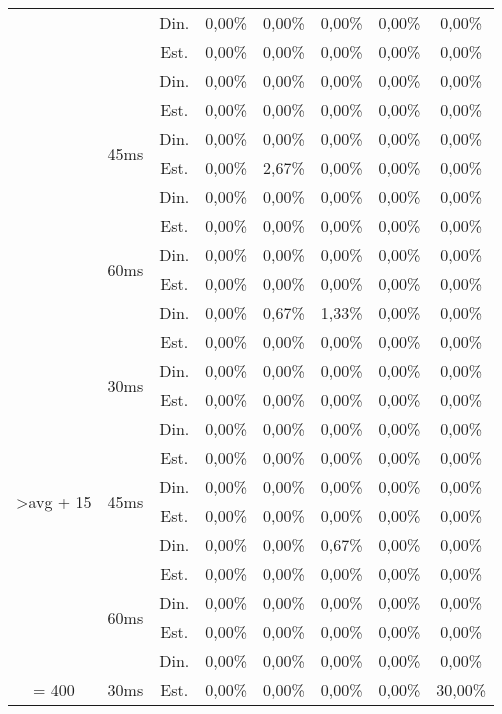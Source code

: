 \begin{center}
\begin{longtable}{|c|c|c|ccccc|}
 &  & Din. & 0,00\% & 0,00\% & 0,00\% & 0,00\% & 0,00\% \\
 &  & Est. & 0,00\% & 0,00\% & 0,00\% & 0,00\% & 0,00\% \\
 &  & Din. & 0,00\% & 0,00\% & 0,00\% & 0,00\% & 0,00\% \\ \cline{2-8} 
 & \multirow{4}{*}{45ms} & Est. & 0,00\% & 0,00\% & 0,00\% & 0,00\% & 0,00\% \\
 &  & Din. & 0,00\% & 0,00\% & 0,00\% & 0,00\% & 0,00\% \\
 &  & Est. & 0,00\% & 2,67\% & 0,00\% & 0,00\% & 0,00\% \\
 &  & Din. & 0,00\% & 0,00\% & 0,00\% & 0,00\% & 0,00\% \\ \cline{2-8} 
 & \multirow{4}{*}{60ms} & Est. & 0,00\% & 0,00\% & 0,00\% & 0,00\% & 0,00\% \\
 &  & Din. & 0,00\% & 0,00\% & 0,00\% & 0,00\% & 0,00\% \\
 &  & Est. & 0,00\% & 0,00\% & 0,00\% & 0,00\% & 0,00\% \\
 &  & Din. & 0,00\% & 0,67\% & 1,33\% & 0,00\% & 0,00\% \\ \hline
\multirow{12}{*}{\textgreater avg + 15} & \multirow{4}{*}{30ms} & Est. & 0,00\% & 0,00\% & 0,00\% & 0,00\% & 0,00\% \\
 &  & Din. & 0,00\% & 0,00\% & 0,00\% & 0,00\% & 0,00\% \\
 &  & Est. & 0,00\% & 0,00\% & 0,00\% & 0,00\% & 0,00\% \\
 &  & Din. & 0,00\% & 0,00\% & 0,00\% & 0,00\% & 0,00\% \\ \cline{2-8} 
 & \multirow{4}{*}{45ms} & Est. & 0,00\% & 0,00\% & 0,00\% & 0,00\% & 0,00\% \\
 &  & Din. & 0,00\% & 0,00\% & 0,00\% & 0,00\% & 0,00\% \\
 &  & Est. & 0,00\% & 0,00\% & 0,00\% & 0,00\% & 0,00\% \\
 &  & Din. & 0,00\% & 0,00\% & 0,67\% & 0,00\% & 0,00\% \\ \cline{2-8} 
 & \multirow{4}{*}{60ms} & Est. & 0,00\% & 0,00\% & 0,00\% & 0,00\% & 0,00\% \\
 &  & Din. & 0,00\% & 0,00\% & 0,00\% & 0,00\% & 0,00\% \\
 &  & Est. & 0,00\% & 0,00\% & 0,00\% & 0,00\% & 0,00\% \\
 &  & Din. & 0,00\% & 0,00\% & 0,00\% & 0,00\% & 0,00\% \\ \hline
\multirow{12}{*}{= 400} & \multirow{4}{*}{30ms} & Est. & 0,00\% & 0,00\% & 0,00\% & 0,00\% & 30,00\% \\

\end{longtable}
\end{center}
